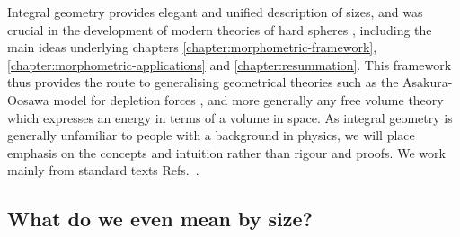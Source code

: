 Integral geometry provides elegant and unified description of sizes, and was crucial in the development of modern theories of hard spheres \cite{RosenfeldPRL1989,KonigPRL2004}, including the main ideas underlying chapters \ref{chapter:morphometric-framework}, \ref{chapter:morphometric-applications} and \ref{chapter:resummation}.
This framework thus provides the route to generalising geometrical theories such as the Asakura-Oosawa model for depletion forces \cite{AsakuraJCP1954,AsakuraJPS1958}, and more generally any free volume theory which expresses an energy in terms of a volume in space.
As integral geometry is generally unfamiliar to people with a background in physics, we will place emphasis on the concepts and intuition rather than rigour and proofs.
We work mainly from standard texts Refs.\ \cite{Santalo2004,SchneiderACIG1984,Schneider2008,Klain1997}.

\subsection{What do we even mean by size?}
\label{sec:what-is-size}

